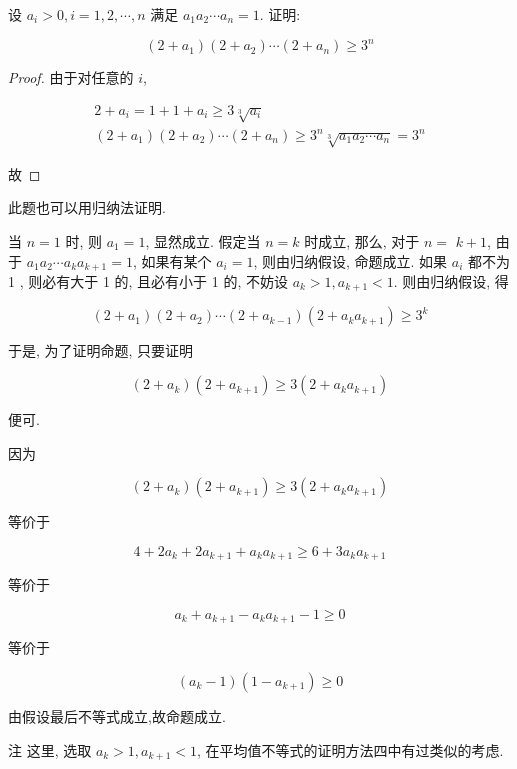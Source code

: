 \begin{example}
	设 $a_{i}>0, i=1,2, \cdots, n$ 满足 $a_{1} a_{2} \cdots a_{n}=1$. 证明:
	
	$$
	\left(2+a_{1}\right)\left(2+a_{2}\right) \cdots\left(2+a_{n}\right) \geqslant 3^{n}
	$$
\end{example}
\begin{proof}
	由于对任意的 $i$,
	
	$$
	\begin{gathered}
	2+a_{i}=1+1+a_{i} \geqslant 3 \sqrt[3]{a_{i}} \\
	\left(2+a_{1}\right)\left(2+a_{2}\right) \cdots\left(2+a_{n}\right) \geqslant 3^{n} \sqrt[3]{a_{1} a_{2} \cdots a_{n}}=3^{n}
	\end{gathered}
	$$
	
	故
\end{proof}
\begin{note}
	此题也可以用归纳法证明.
	
	当 $n=1$ 时, 则 $a_{1}=1$, 显然成立. 假定当 $n=k$ 时成立, 那么, 对于 $n=$ $k+1$, 由于 $a_{1} a_{2} \cdots a_{k} a_{k+1}=1$, 如果有某个 $a_{i}=1$, 则由归纳假设, 命题成立. 如果 $a_{i}$ 都不为 1 , 则必有大于 1 的, 且必有小于 1 的, 不妨设 $a_{k}>1, a_{k+1}<1$. 则由归纳假设, 得
	
	$$
	\left(2+a_{1}\right)\left(2+a_{2}\right) \cdots\left(2+a_{k-1}\right)\left(2+a_{k} a_{k+1}\right) \geqslant 3^{k}
	$$
	
	于是, 为了证明命题, 只要证明
	
	$$
	\left(2+a_{k}\right)\left(2+a_{k+1}\right) \geqslant 3\left(2+a_{k} a_{k+1}\right)
	$$
	
	便可.
	
	因为
	
	$$
	\left(2+a_{k}\right)\left(2+a_{k+1}\right) \geqslant 3\left(2+a_{k} a_{k+1}\right)
	$$
	
	等价于
	
	$$
	4+2 a_{k}+2 a_{k+1}+a_{k} a_{k+1} \geqslant 6+3 a_{k} a_{k+1}
	$$
	
	等价于
	
	$$
	a_{k}+a_{k+1}-a_{k} a_{k+1}-1 \geqslant 0
	$$
	
	等价于
	
	$$
	\left(a_{k}-1\right)\left(1-a_{k+1}\right) \geqslant 0
	$$
	
	由假设最后不等式成立,故命题成立.
	
	注 这里, 选取 $a_{k}>1, a_{k+1}<1$, 在平均值不等式的证明方法四中有过类似的考虑.
\end{note}

